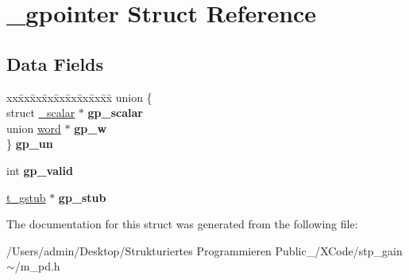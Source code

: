 \hypertarget{struct__gpointer}{}\section{\+\_\+gpointer Struct Reference}
\label{struct__gpointer}
\subsection*{Data Fields}
\begin{DoxyCompactItemize}
\item 
\mbox{\label{struct__gpointer_a0bdcbb163747bc52d28aec36e672a250}} 
\begin{tabbing}
xx\=xx\=xx\=xx\=xx\=xx\=xx\=xx\=xx\=\kill
union \{\\
\>struct \hyperlink{struct__scalar}{\_scalar} $\ast$ {\bfseries gp\_scalar}\\
\>union \hyperlink{unionword}{word} $\ast$ {\bfseries gp\_w}\\
\} {\bfseries gp\_un}\\

\end{tabbing}\item 
\mbox{\label{struct__gpointer_a8793489ee1c20be7f5e8d3475c711a0e}} 
int {\bfseries gp\+\_\+valid}
\item 
\mbox{\label{struct__gpointer_a52660c1d465beb6fc175a775b45f1c8d}} 
\hyperlink{struct__gstub}{t\+\_\+gstub} $\ast$ {\bfseries gp\+\_\+stub}
\end{DoxyCompactItemize}


The documentation for this struct was generated from the following file\+:\begin{DoxyCompactItemize}
\item 
/\+Users/admin/\+Desktop/\+Strukturiertes Programmieren Public\+\_/\+X\+Code/stp\+\_\+gain$\sim$/m\+\_\+pd.\+h\end{DoxyCompactItemize}
